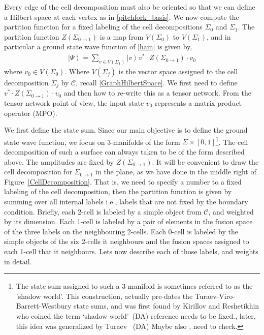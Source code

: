 \documentclass[12pt,a4paper]{article}
\newcounter{arrow}
\newcommand{\ra}{\rightarrow}
\newcommand{\mcd}{\mathcal{D}}
\newcommand{\mcc}{\mathcal{C}}
\newcommand{\mcm}{\mathcal{M}}
\newcommand{\ket}[1]{\ensuremath{\left|#1\right\rangle}}
\newcommand{\dave}[1]{{\color{ao(english)}\footnotesize{(DA) #1}}}
\begin{document}
Every edge of the cell decomposition must also be oriented so that we can define a Hilbert space at each vertex as in \eqref{pitchfork_basis}.
We now compute the partition function for a fixed labeling of the cell decompositions $\Sigma_0$ and $\Sigma_1$. 
The partition function $Z(\Sigma_{0\ra1})$ is a map from $V(\Sigma_0)$ to $V(\Sigma_1)$, 
and in particular a ground state wave function of \eqref{ham} is given by,
\begin{align}
\ket{\Psi} = \sum_{v \in V(\Sigma_1)} \ket{v} v^* \cdot Z(\Sigma_{0\ra1})\cdot v_0
\end{align}
where $v_0 \in V(\Sigma_0)$. 
Where $V(\Sigma_j)$ is the vector space assigned to the cell decomposition $\Sigma_j$ by $\mcc$, recall \eqref{GraphHilbertSpace}.
We first need to define $ v^* \cdot Z(\Sigma_{0\ra1})\cdot v_0$ and then how to re-write this as a tensor network.
From the tensor network point of view, the input state $v_0$ represents a matrix product operator (MPO). 

We first define the state sum. 
Since our main objective is to define the ground state wave function, we focus on 3-manifolds of the form $\Sigma \times [0,1]$\footnote{The state sum assigned to such a 3-manifold is sometimes referred to as the 'shadow world'.
This construction, actually pre-dates the Turaev-Viro-Barrett-Westbury state sums, 
and was first found by Kirillov and Reshetikhin who coined the term `shadow world'~\cite{Kirillow1989}\dave{reference needs to be fixed.}, 
later, this idea was generalized by Turaev~\cite{turaev1992shadow} \dave{Maybe also \cite{turaev1990}, need to check.}}.
The cell decomposition of such a surface can always taken to be of the form described above. 
The amplitudes are fixed by $Z(\Sigma_{0\ra1})$. 
It will be convenient to draw the cell decomposition for $\Sigma_{0\ra1}$ in the plane, 
as we have done in the middle right of Figure~\ref{CellDecomposition}.
That is, we need to specify a number to a fixed labeling of the cell decomposition, then the partition function is given by summing over all internal labels i.e., labels that are not fixed by the boundary condition.
Briefly, each 2-cell is labeled by a simple object from $\mcc$, and weighted by its dimension. 
Each 1-cell is labeled by a pair of elements in the fusion space of the three labels on the neighbouring 2-cells. 
Each 0-cell is labeled by the simple objects of the six 2-cells it neighbours and the fusion spaces assigned to each 1-cell that it neighbours.
Lets now describe each of those labels, and weights in detail.
\end{document}
